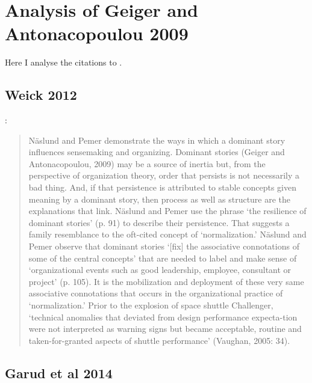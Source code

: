 \section{Analysis of Geiger and Antonacopoulou 2009}

Here I analyse the citations to \cite{geiger2009narratives}.\\

\subsection{Weick 2012}

\cite[pp.143-144]{weick2012organized}:
\begin{quote}
N\"{a}slund  and  Pemer  demonstrate  the  ways  in  which  a  dominant  story  influences sensemaking and organizing. Dominant stories (Geiger and Antonacopoulou, 2009) may be a source of inertia but, from the perspective of organization theory, order that persists is  not  necessarily  a  bad  thing.  And,  if  that  persistence  is  attributed  to  stable  concepts given meaning by a dominant story, then process as well as structure are the explanations that link. N\"{a}slund and Pemer use the phrase ‘the resilience of dominant stories’ (p. 91) to describe their persistence. That suggests a family resemblance to the oft-cited concept of ‘normalization.’ N\"{a}slund and Pemer observe that dominant stories ‘[fix] the associative connotations of some of the central concepts’ that are needed to label and make sense of ‘organizational events such as good leadership, employee, consultant or project’ (p. 105). It is the mobilization and deployment of these very same associative connotations that occurs in the organizational practice of ‘normalization.’ Prior to the explosion of space shuttle Challenger, ‘technical anomalies that deviated from design performance expecta-tion were not interpreted as warning signs but became acceptable, routine and taken-for-granted aspects of shuttle performance’ (Vaughan, 2005: 34).\\
\begin{flushright}
\end{flushright}
\end{quote}

\subsection{Garud et al 2014}

